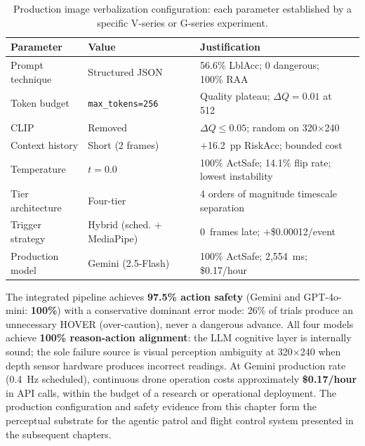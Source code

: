 \begin{table}[ht]
  \caption{Production image verbalization configuration: each parameter
    established by a specific V-series or G-series experiment.}
  \label{tab:ch2_production_config}
  \centering
  \small
  \begin{tabular}{llll}
    \toprule
    Parameter & Value & Justification  \\
    \midrule
    Prompt technique & Structured JSON & 56.6\% LblAcc; 0 dangerous; 100\% RAA  \\
    Token budget & \texttt{max\_tokens=256} & Quality plateau; $\Delta Q=0.01$ at 512 \\
    CLIP & Removed & $\Delta Q \leq 0.05$; random on 320$\times$240 \\
    Context history & Short (2 frames) & $+$16.2~pp RiskAcc; bounded cost\\
    Temperature & $t=0.0$ & 100\% ActSafe; 14.1\% flip rate; lowest instability\\
    Tier architecture & Four-tier & 4 orders of magnitude timescale separation\\
    Trigger strategy & Hybrid (sched. + MediaPipe) & 0~frames late; $+$\$0.00012/event\\
    Production model & Gemini (2.5-Flash) & 100\% ActSafe; 2,554~ms; \$0.17/hour \\
    \bottomrule
  \end{tabular}
\end{table}

The integrated pipeline achieves \textbf{97.5\% action safety} (Gemini and GPT-4o-mini: \textbf{100\%}) with a conservative dominant error mode: 26\% of trials produce an unnecessary HOVER (over-caution), never a dangerous advance.
All four models achieve \textbf{100\% reason-action alignment}: the LLM cognitive layer is internally sound; the sole failure source is visual perception ambiguity at 320$\times$240 when depth sensor hardware produces incorrect readings. 
At Gemini production rate (0.4~Hz scheduled), continuous drone operation costs approximately \textbf{\$0.17/hour} in API calls, within the budget of a research or operational deployment. 
The production configuration and safety evidence from this chapter form the perceptual substrate for the agentic patrol and flight control system presented in the subsequent chapters.
